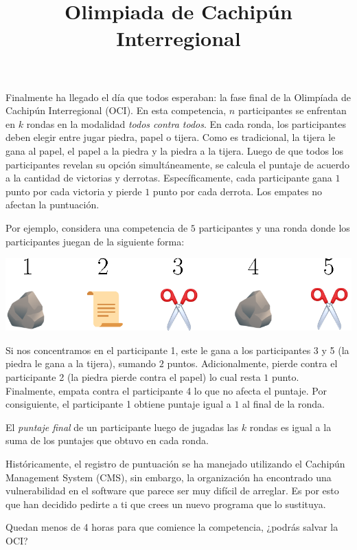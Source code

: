 \documentclass{oci}
\title{Olimpiada de Cachipún Interregional}
\begin{document}
\begin{problemDescription}
  Finalmente ha llegado el día que todos esperaban:
  la fase final de la Olimpíada de Cachipún Interregional (OCI).
  En esta competencia, $n$ participantes se enfrentan en $k$ rondas
  en la modalidad \emph{todos contra todos}.
  En cada ronda, los participantes deben elegir entre jugar piedra, papel o tijera.
  Como es tradicional, la tijera le gana al papel, el papel a la piedra y la piedra a
  la tijera.
  Luego de que todos los participantes revelan su opción simultáneamente, se
  calcula el puntaje de acuerdo a la cantidad de victorias y derrotas.
  Específicamente, cada participante gana $1$ punto por cada victoria
  y pierde $1$ punto por cada derrota.
  Los empates no afectan la puntuación.

  Por ejemplo, considera una competencia de $5$ participantes y una ronda donde
  los participantes juegan de la siguiente forma:
  \begin{center}
    \includegraphics[scale=0.8]{ronda.eps}
  \end{center}
  Si nos concentramos en el participante 1, este le gana a los participantes 3 y 5
  (la piedra le gana a la tijera), sumando $2$ puntos.
  Adicionalmente, pierde contra el participante 2 (la piedra pierde contra el papel)
  lo cual resta $1$ punto.
  Finalmente, empata contra el participante 4 lo que no afecta el puntaje.
  Por consiguiente, el participante 1 obtiene puntaje igual a $1$ al final de la ronda.

  El \emph{puntaje final} de un participante luego de jugadas las $k$ rondas
  es igual a la suma de los puntajes que obtuvo en cada ronda.

  Históricamente, el registro de puntuación se ha manejado utilizando el
  Cachipún Management System (CMS), sin embargo, la organización ha encontrado
  una vulnerabilidad en el software que parece ser muy difícil de arreglar.
  Es por esto que han decidido pedirte a ti que crees un nuevo programa que lo
  sustituya.

  Quedan menos de 4 horas para que comience la competencia, ¿podrás salvar la OCI?
\end{problemDescription}
\end{document}
